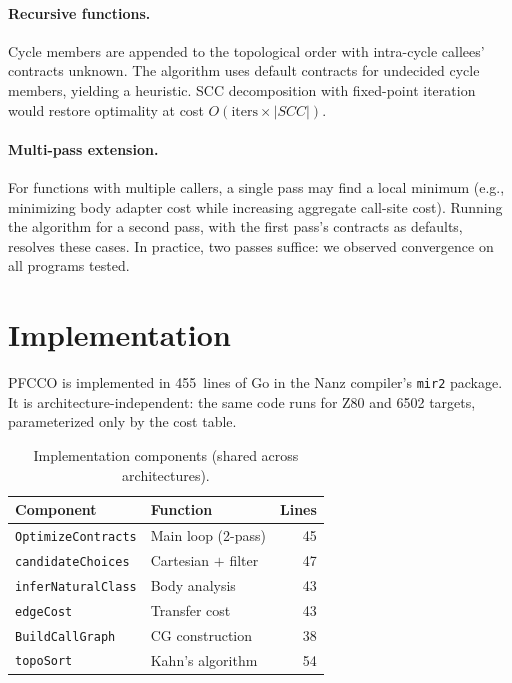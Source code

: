 \documentclass[sigplan,screen,nonacm]{acmart}
\begin{document}
\paragraph{Recursive functions.}
Cycle members are appended to the topological order with intra-cycle
callees' contracts unknown.  The algorithm uses default contracts for
undecided cycle members, yielding a heuristic.  SCC decomposition with
fixed-point iteration would restore optimality at cost
$O(\text{iters} \times |SCC|)$.

\paragraph{Multi-pass extension.}
For functions with multiple callers, a single pass may find a local minimum
(e.g., minimizing body adapter cost while increasing aggregate call-site
cost).  Running the algorithm for a second pass, with the first pass's
contracts as defaults, resolves these cases.  In practice, two passes
suffice: we observed convergence on all programs tested.

\section{Implementation}
\label{sec:impl}

PFCCO is implemented in 455~lines of Go in the Nanz compiler's \texttt{mir2}
package.  It is architecture-independent: the same code runs for Z80 and
6502 targets, parameterized only by the cost table.

\begin{table}[h]
\centering\small
\caption{Implementation components (shared across architectures).}
\label{tab:impl}
\begin{tabular}{@{}llr@{}}
\toprule
Component & Function & Lines \\
\midrule
\texttt{OptimizeContracts}  & Main loop (2-pass)    & 45 \\
\texttt{candidateChoices}   & Cartesian $+$ filter  & 47 \\
\texttt{inferNaturalClass}  & Body analysis          & 43 \\
\texttt{edgeCost}           & Transfer cost          & 43 \\
\texttt{BuildCallGraph}     & CG construction        & 38 \\
\texttt{topoSort}           & Kahn's algorithm       & 54 \\
\bottomrule
\end{tabular}
\end{table}
\end{document}
